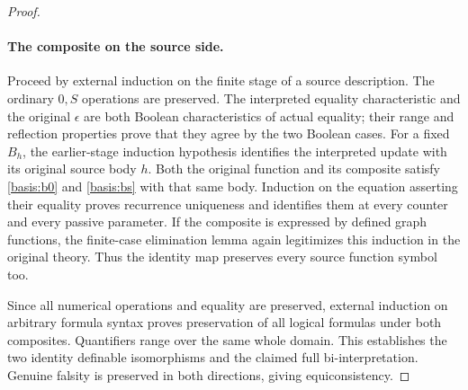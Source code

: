 \begin{proof}
\paragraph{The composite on the source side.}
Proceed by external induction on the finite stage of a source
description.  The ordinary $0,S$ operations are preserved.
The interpreted equality characteristic and the original $\epsilon$
are both Boolean characteristics of actual equality; their range and
reflection properties prove that they agree by the two Boolean cases.
For a fixed $B_h$, the earlier-stage induction hypothesis identifies
the interpreted update with its original source body $h$.  Both the
original function and its composite satisfy
\eqref{basis:b0} and \eqref{basis:bs} with that same body.  Induction
on the equation asserting their equality proves recurrence uniqueness
and identifies them at every counter and every passive parameter.
If the composite is expressed by defined graph functions, the
finite-case elimination lemma again legitimizes this induction in
the original theory.  Thus the identity map preserves every source
function symbol too.

Since all numerical operations and equality are preserved, external
induction on arbitrary formula syntax proves preservation of all
logical formulas under both composites.  Quantifiers range over the
same whole domain.  This establishes the two identity definable
isomorphisms and the claimed full bi-interpretation.  Genuine falsity
is preserved in both directions, giving equiconsistency.
\end{proof}

